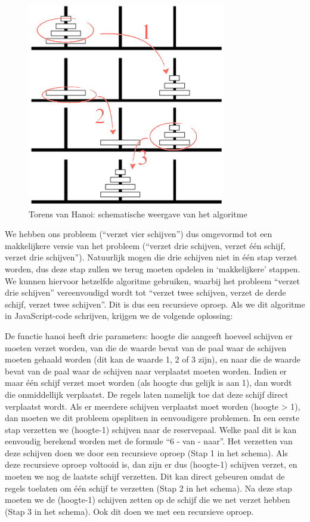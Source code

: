 \begin{figure}
\centering
\includegraphics[scale=0.8]{Recursie/hanoi2a.png}
\caption{Torens van Hanoi: schematische weergave van het algoritme}\label{fig:hanoi2}
\end{figure}

We hebben ons probleem (``verzet vier schijven'') dus omgevormd tot een makkelijkere versie van het probleem (``verzet drie schijven, verzet \'e\'en schijf, verzet drie schijven''). Natuurlijk mogen die drie schijven niet in \'e\'en stap verzet worden, dus deze stap zullen we terug moeten opdelen in `makkelijkere' stappen. We kunnen hiervoor hetzelfde algoritme gebruiken, waarbij het probleem ``verzet drie schijven'' vereenvoudigd wordt tot ``verzet twee schijven, verzet de derde schijf, verzet twee schijven''. Dit is dus een recursieve oproep. Als we dit algoritme in JavaScript-code schrijven, krijgen we de volgende oplossing:


De functie hanoi heeft drie parameters: hoogte die aangeeft hoeveel schijven er moeten verzet worden, van die de waarde bevat van de paal waar de schijven moeten gehaald worden (dit kan de waarde 1, 2 of 3 zijn), en naar die de waarde bevat van de paal waar de schijven naar verplaatst moeten worden. Indien er maar \'e\'en schijf verzet moet worden (als hoogte dus gelijk is aan 1), dan wordt die onmiddellijk verplaatst. De regels laten namelijk toe dat deze schijf direct verplaatst wordt. Als er meerdere schijven verplaatst moet worden (hoogte > 1), dan moeten we dit probleem opsplitsen in eenvoudigere problemen. In een eerste stap verzetten we (hoogte-1) schijven naar de reservepaal. Welke paal dit is kan eenvoudig berekend worden met de formule ``6 - van - naar''. Het verzetten van deze schijven doen we door een recursieve oproep (Stap 1 in het schema). Als deze recursieve oproep voltooid is, dan zijn er dus (hoogte-1) schijven verzet, en moeten we nog de laatste schijf verzetten. Dit kan direct gebeuren omdat de regels toelaten om \'e\'en schijf te verzetten (Stap 2 in het schema). Na deze stap moeten we de (hoogte-1) schijven zetten op de schijf die we net verzet hebben (Stap 3 in het schema). Ook dit doen we met een recursieve oproep.

